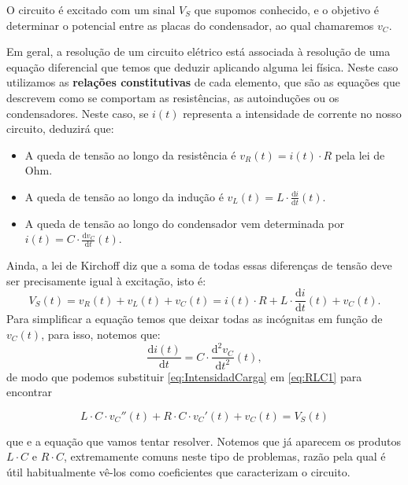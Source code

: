 O circuito é excitado com um sinal $V_S$ que supomos conhecido, e o objetivo é determinar o potencial entre as placas do condensador, ao qual chamaremos $v_C$.

Em geral, a resolução de um circuito elétrico está associada à resolução de uma equação diferencial que temos que deduzir aplicando alguma lei física. Neste caso utilizamos as \textbf{relações constitutivas} de cada elemento, que são as equações que descrevem como se comportam as resistências, as autoinduções ou os condensadores. Neste caso, se $i(t)$ representa a intensidade de corrente no nosso circuito, deduzirá que:

\begin{itemize}
\item A queda de tensão ao longo da resistência é $v_R(t) = i(t) \cdot R$ pela lei de Ohm.
\item A queda de tensão ao longo da indução é $v_L(t) = L\cdot \frac{\text{d} i}{\text{d}t}(t)$.
\item A queda de tensão ao longo do condensador vem determinada por $i(t) = C\cdot \frac{\text{d}v_C}{\text{d}t}(t)$.
\end{itemize}

Ainda, a lei de Kirchoff diz que a soma de todas essas diferenças de tensão deve ser precisamente igual à excitação, isto é:
\begin{equation}
  \label{eq:RLC1}
  V_{S}(t) = v_{R}(t) + v_{L}(t) + v_{C}(t) = i(t)\cdot R + L\cdot \frac{\text{d}i}{\text{d}t}(t) + v_C(t).
\end{equation}
Para simplificar a equação temos que deixar todas as incógnitas em função de $v_C(t)$, para isso, notemos que:
\begin{equation}
  \label{eq:IntensidadCarga}
  \frac{\text{d}i(t)}{\text{d}t} = C\cdot \frac{\text{d}^2v_C}{\text{d}t^2}(t),
\end{equation}
de modo que podemos substituir \eqref{eq:IntensidadCarga} em \eqref{eq:RLC1} para encontrar
\begin{mybox}\vspace{-5mm}
  \begin{equation}
    \label{eq:RLC}
    L\cdot C\cdot v_C''(t) + R\cdot C\cdot v_C'(t) + v_C(t) = V_S(t)
  \end{equation}
\end{mybox}
que e a equação que vamos tentar resolver. Notemos que já aparecem os produtos $L\cdot C$ e $R\cdot C$, extremamente comuns neste tipo de problemas, razão pela qual é útil habitualmente vê-los como coeficientes que caracterizam o circuito.


